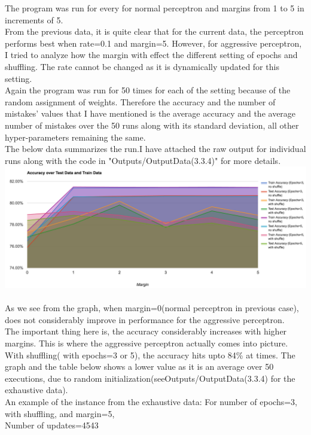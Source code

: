 \documentclass[12pt, fullpage,letterpaper]{article}
\begin{document}
The program was run for every for normal perceptron and margins from 1 to 5 in increments of 5.\\From the previous data, it is quite clear that for the current data, the perceptron performs best when rate=0.1 and margin=5. However, for aggressive perceptron, I tried to analyze how the margin with effect the different setting of epochs and shuffling. The rate cannot be changed as it is dynamically updated for this setting.\\
Again the program was run for 50 times for each of the setting because of the random assignment of weights. Therefore the accuracy and the number of mistakes' values that I have mentioned is the average accuracy and the average number of mistakes over the 50 runs along with its standard deviation, all other hyper-parameters remaining the same.\\
The below data summarizes the run.I have attached the raw output for individual runs along with the code in "Outputs/OutputData(3.3.4)" for more details.\\
 \includegraphics[scale=0.4]{334.png}\\
 \\As we see from the graph, when margin=0(normal perceptron in previous case), does not considerably improve in performance for the aggressive perceptron.\\
 The important thing here is, the accuracy considerably increases with higher margins. This is where the aggressive perceptron actually comes into picture.\\
 With shuffling( with epochs=3 or 5), the accuracy hits upto 84\% at times. The graph and the table below shows a lower value as it is an average over 50 executions, due to random initialization(seeOutputs/OutputData(3.3.4) for the exhaustive data).\\
 An example of the instance from the exhaustive data:  For number of epochs=3, with shuffling, and margin=5,\\
 Number of updates=4543\\
\end{document}
